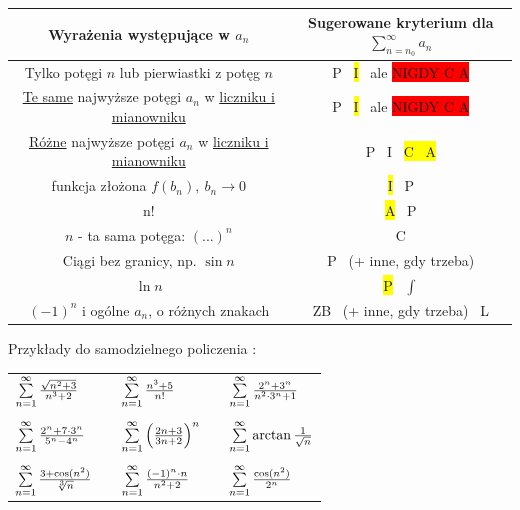 \begin{table}[!htbp]
    \centering
    \begin{adjustbox}{width=0.9\textwidth}
    \begin{tabular}{|c|c|}
    \hline
    Wyrażenia występujące w $a_n$ & Sugerowane kryterium dla $ \sum\limits_{n=n_0}^{\infty} a_n $ \\[15pt] \hline
    Tylko potęgi $n$ lub pierwiastki z potęg $n$ & P \ \colorbox{yellow}{I} \ ale \colorbox{red}{NIGDY C A} \\[10pt] \hline 
    \underline{Te same} najwyższe potęgi $a_n$ w \underline{liczniku i mianowniku} & P \ \colorbox{yellow}{I} \ ale \colorbox{red}{NIGDY C A} \\[10pt] \hline
    \underline{Różne} najwyższe potęgi $a_n$ w \underline{liczniku i mianowniku} & P \ I \ \colorbox{yellow}{C \ A} \\[10pt] \hline
    funkcja złożona $ f(b_n), \ b_n \to 0 $ & \colorbox{yellow}{I} \ P \\[10pt] \hline
    n! & \colorbox{yellow}{A} \ P \\[10pt] \hline
    $n$ - ta sama potęga: $(...)^n$ & C \\[10pt] \hline
    Ciągi bez granicy, np. $\sin n$ & P \ (+ inne, gdy trzeba) \\[10pt] \hline
    $\ln n$ & \colorbox{yellow}{P} \ $\int$ \\[10pt] \hline
    $(-1)^n$ i ogólne $a_n$, o różnych znakach & ZB \ (+ inne, gdy trzeba) \ L \\[10pt] \hline
    \end{tabular}
\end{adjustbox}
\end{table}


\begin{center}
    Przykłady do samodzielnego policzenia : 
    \bigskip

    \begin{adjustbox}{width=0.5\textwidth}
    \begin{tabular}{l c l c l}
        $ \sum\limits_{n = 1}^{\infty} \frac{\sqrt{n^2 + 3}}{n^3 + 2} $ && $ \sum\limits_{n = 1}^{\infty} \frac{n^3 + 5}{n!} $ && $ \sum\limits_{n = 1}^{\infty} \frac{2^n + 3^n}{n^2 \cdot 3^n + 1} $ \\
        \\
        $ \sum\limits_{n = 1}^{\infty} \frac{2^n + 7 \cdot 3^n}{5^n - 4^n} $ && $ \sum\limits_{n = 1}^{\infty} \left( \frac{2n+3}{3n+2} \right)^n $ && $ \sum\limits_{n = 1}^{\infty} \arctan \frac{1}{\sqrt{n}} $ \\
        \\
        $ \sum\limits_{n = 1}^{\infty} \frac{3 + \cos (n^2)}{\sqrt[3]{n}} $ && $ \sum\limits_{n = 1}^{\infty} \frac{(-1)^n \cdot n}{n^2 + 2} $ && $ \sum\limits_{n = 1}^{\infty} \frac{\cos (n^2)}{2^n} $
        \\
    \end{tabular}    
\end{adjustbox}
\end{center}
